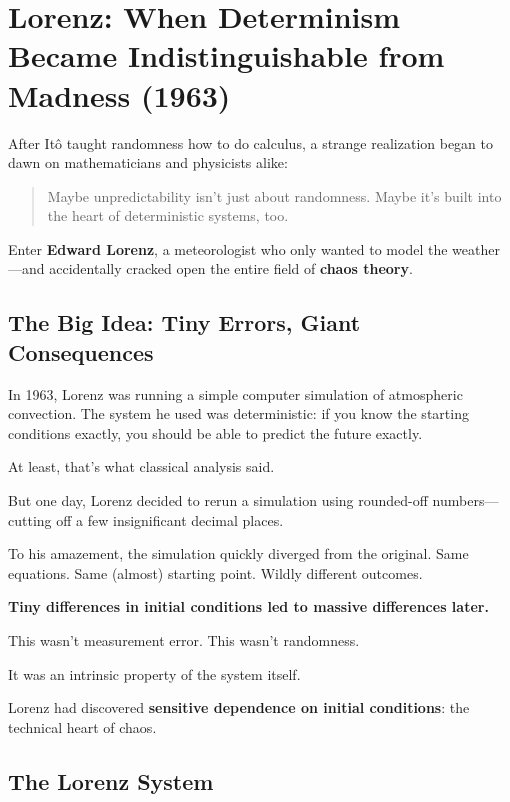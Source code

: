 \section{Lorenz: When Determinism Became Indistinguishable from Madness (1963)}

After Itô taught randomness how to do calculus, a strange realization began to dawn on mathematicians and physicists alike:

\begin{quote}
    Maybe unpredictability isn’t just about randomness.  
    Maybe it’s built into the heart of deterministic systems, too.
\end{quote}

Enter \textbf{Edward Lorenz}, a meteorologist who only wanted to model the weather—and accidentally cracked open the entire field of \textbf{chaos theory}.

\subsection*{The Big Idea: Tiny Errors, Giant Consequences}

In 1963, Lorenz was running a simple computer simulation of atmospheric convection.  
The system he used was deterministic:  
if you know the starting conditions exactly, you should be able to predict the future exactly.

At least, that’s what classical analysis said.

But one day, Lorenz decided to rerun a simulation using rounded-off numbers—cutting off a few insignificant decimal places.

To his amazement, the simulation quickly diverged from the original.  
Same equations.  
Same (almost) starting point.  
Wildly different outcomes.

\textbf{Tiny differences in initial conditions led to massive differences later.}

This wasn’t measurement error.  
This wasn’t randomness.

It was an intrinsic property of the system itself.

\smallskip

Lorenz had discovered \textbf{sensitive dependence on initial conditions}: the technical heart of chaos.

\subsection*{The Lorenz System}

